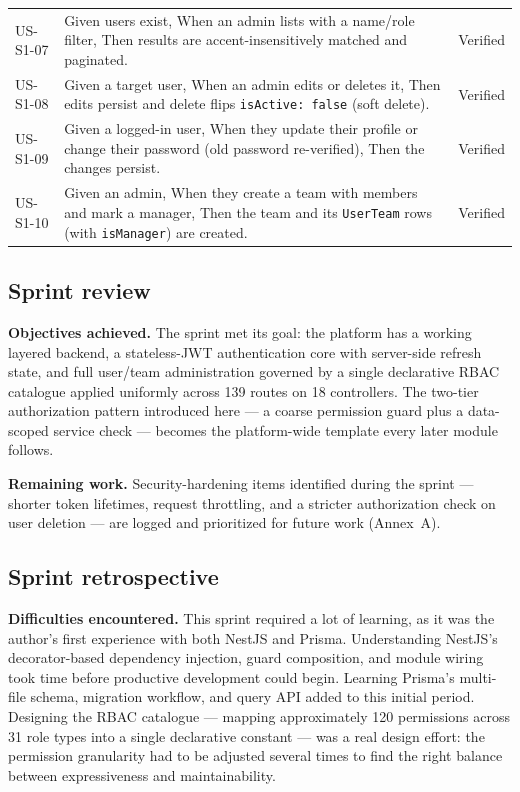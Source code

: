 \begin{longtable}{@{}p{1.8cm}p{8.3cm}p{3.8cm}@{}}
\rowcolor{rowalt}
US-S1-07 & Given users exist, When an admin lists with a name/role filter, Then results are accent-insensitively matched and paginated. & \pass{} Verified \\
US-S1-08 & Given a target user, When an admin edits or deletes it, Then edits persist and delete flips \texttt{isActive: false} (soft delete). & \pass{} Verified \\
\rowcolor{rowalt}
US-S1-09 & Given a logged-in user, When they update their profile or change their password (old password re-verified), Then the changes persist. & \pass{} Verified \\
US-S1-10 & Given an admin, When they create a team with members and mark a manager, Then the team and its \texttt{UserTeam} rows (with \texttt{isManager}) are created. & \pass{} Verified \\
\end{longtable}

\subsection{Sprint review}

\textbf{Objectives achieved.} The sprint met its goal: the platform has a working layered
backend, a stateless-JWT authentication core with server-side refresh state, and full user/team
administration governed by a single declarative RBAC catalogue applied uniformly across 139
routes on 18 controllers. The two-tier authorization pattern introduced here --- a coarse
permission guard plus a data-scoped service check --- becomes the platform-wide template every
later module follows.

\textbf{Remaining work.} Security-hardening items identified during the sprint --- shorter token
lifetimes, request throttling, and a stricter authorization check on user deletion --- are logged
and prioritized for future work (Annex~A).

\subsection{Sprint retrospective}

\textbf{Difficulties encountered.} This sprint required a lot of learning, as it was the
author's first experience with both NestJS and Prisma. Understanding NestJS's decorator-based
dependency injection, guard composition, and module wiring took time before productive
development could begin. Learning Prisma's multi-file schema, migration workflow, and query API
added to this initial period. Designing the RBAC catalogue --- mapping approximately 120
permissions across 31 role types into a single declarative constant --- was a real design
effort: the permission granularity had to be adjusted several times to find the right balance
between expressiveness and maintainability.


